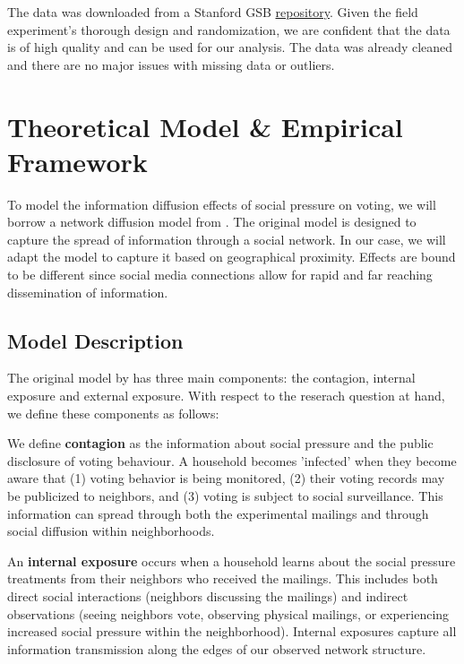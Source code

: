 \documentclass[11pt, draft]{article}
\begin{document}
The data was downloaded from a Stanford GSB \href{https://github.com/gsbDBI/ExperimentData}{repository}. Given the field experiment's thorough design and randomization, we are confident that the data is of high quality and can be used for our analysis. The data was already cleaned and there are no major issues with missing data or outliers.


\pagebreak

\section{Theoretical Model \& Empirical Framework}
To model the information diffusion effects of social pressure on voting, we will borrow a network diffusion model from \cite{myers_information_2012}. The original model is designed to capture the spread of information through a social network. In our case, we will adapt the model to capture it based on geographical proximity. Effects are bound to be different since social media connections allow for rapid and far reaching dissemination of information.

\subsection{Model Description}
The original model by \cite{myers_information_2012} has three main components: the contagion, internal exposure and external exposure. With respect to the reserach question at hand, we define these components as follows:

We define \textbf{contagion} as the information about social pressure and the public disclosure of voting behaviour. A household becomes 'infected' when they become aware that (1) voting behavior is being monitored, (2) their voting records may be publicized to neighbors, and (3) voting is subject to social surveillance. This information can spread through both the experimental mailings and through social diffusion within neighborhoods.

An \textbf{internal exposure} occurs when a household learns about the social pressure treatments from their neighbors who received the mailings. This includes both direct social interactions (neighbors discussing the mailings) and indirect observations (seeing neighbors vote, observing physical mailings, or experiencing increased social pressure within the neighborhood). Internal exposures capture all information transmission along the edges of our observed network structure.
\end{document}
